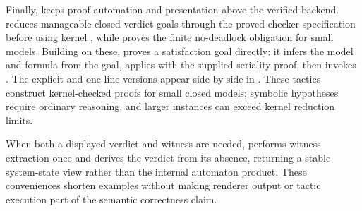 Finally,  keeps proof automation and presentation
above the verified backend.   reduces manageable closed
verdict goals through the proved checker specification before using kernel
, while  proves the finite no-deadlock
obligation for small models.  Building on these, 
proves a satisfaction goal directly: it infers the model and formula from the
goal, applies  with the supplied seriality proof, then
invokes .  The explicit and one-line versions appear side
by side in .  These tactics construct
kernel-checked proofs for small closed models; symbolic hypotheses require
ordinary reasoning, and larger instances can exceed kernel reduction limits.

When both a displayed verdict and witness are
needed,  performs witness extraction once and derives the
verdict from its absence, returning a stable system-state view rather than the
internal automaton product.  These conveniences shorten examples without
making renderer output or tactic execution part of the semantic correctness
claim.
